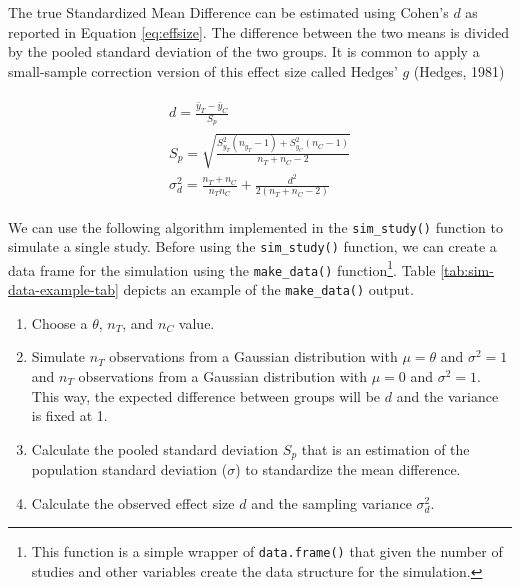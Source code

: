 \documentclass[
  man,floatsintext]{apa6}
\providecommand{\tightlist}{%
  \setlength{\itemsep}{0pt}\setlength{\parskip}{0pt}}
\begin{document}
The true Standardized Mean Difference can be estimated using Cohen's \(d\) as reported in Equation \eqref{eq:effsize}. The difference between the two means is divided by the pooled standard deviation of the two groups. It is common to apply a small-sample correction version of this effect size called Hedges' \(g\) (Hedges, 1981)

\begin{align}
\begin{gathered}
d = \frac{\bar y_T - \bar y_C}{S_p} \\
S_p = \sqrt{\frac{S^2_{y_T}(n_{y_T} - 1) + S^2_{y_C}(n_{C} - 1)}{n_{T} + n_{C} - 2}} \\
\sigma^2_d = \frac{n_{T} + n_{C}}{n_{T}n_{C}} + \frac{d^2}{2(n_{T} + n_{C} - 2)}
\label{eq:effsize}
\end{gathered}
\end{align}

We can use the following algorithm implemented in the \texttt{sim\_study()} function to simulate a single study. Before using the \texttt{sim\_study()}
function, we can create a data frame for the simulation using the \texttt{make\_data()} function\footnote{This function is a simple wrapper of \texttt{data.frame()} that given the number of studies and other variables create the data structure for the simulation.}. Table \ref{tab:sim-data-example-tab} depicts an example of the \texttt{make\_data()} output.

\begin{enumerate}
\def\labelenumi{\arabic{enumi}.}
\tightlist
\item
  Choose a \(\theta\), \(n_{T}\), and \(n_{C}\) value.
\item
  Simulate \(n_{T}\) observations from a Gaussian distribution with \(\mu = \theta\) and \(\sigma^{2} = 1\) and \(n_{T}\) observations from a Gaussian distribution with \(\mu = 0\) and \(\sigma^{2} = 1\). This way, the expected difference between groups will be \(d\) and the variance is fixed at 1.
\item
  Calculate the pooled standard deviation \(S_{p}\) that is an estimation of the population standard deviation (\(\sigma\)) to standardize the mean difference.
\item
  Calculate the observed effect size \(d\) and the sampling variance \(\sigma_{d}^{2}\).
\end{enumerate}

\scriptsize
\end{document}
